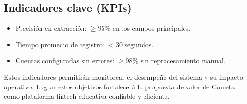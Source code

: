 \subsection*{Indicadores clave (KPIs)}
\begin{itemize}
  \item Precisión en extracción: $\geq$95\% en los campos principales.
  \item Tiempo promedio de registro: $<30$ segundos.
  \item Cuentas configuradas sin errores: $\geq$98\% sin reprocesamiento manual.
\end{itemize}

\noindent Estos indicadores permitirán monitorear el desempeño del sistema y su impacto operativo. Lograr estos objetivos fortalecerá la propuesta de valor de Cometa como plataforma fintech educativa confiable y eficiente.


